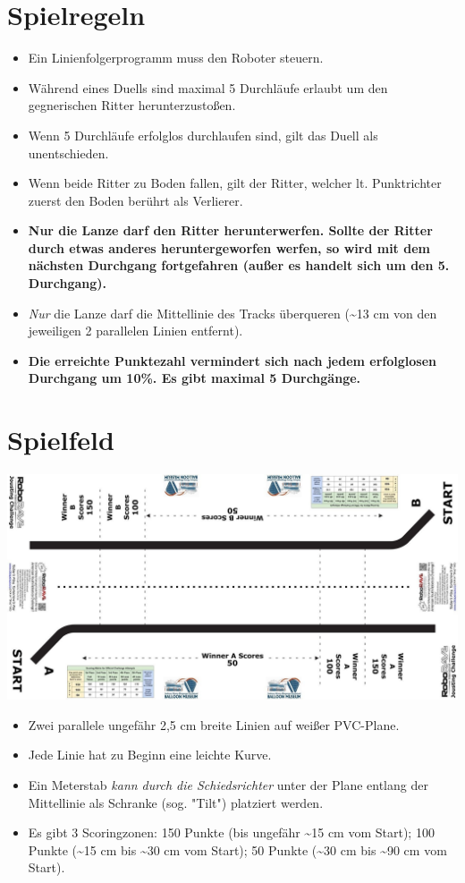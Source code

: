 \documentclass[a4paper,12pt]{article}
\begin{document}
\section{Spielregeln}
\begin{itemize}
	\item Ein Linienfolgerprogramm muss den Roboter steuern.
	
	\item Während eines Duells sind maximal 5 Durchläufe erlaubt um den gegnerischen Ritter herunterzustoßen.
	\item Wenn 5 Durchläufe erfolglos durchlaufen sind, gilt das Duell als unentschieden.
	\item Wenn beide Ritter zu Boden fallen, gilt der Ritter, welcher lt. Punktrichter zuerst den Boden berührt als
	Verlierer.
	\item \textbf{Nur die Lanze darf den Ritter herunterwerfen. Sollte der Ritter durch etwas anderes heruntergeworfen werfen,
	so wird mit dem nächsten Durchgang fortgefahren (außer es handelt sich um den 5. Durchgang).}
	\item \emph{Nur} die Lanze darf die Mittellinie des Tracks überqueren (\textasciitilde13 cm von den jeweiligen 2 parallelen Linien entfernt).
	\item \textbf{Die erreichte Punktezahl vermindert sich nach jedem erfolglosen Durchgang um 10\%. Es gibt maximal 5 Durchgänge.}
\end{itemize}
\section{Spielfeld}
\includegraphics[width=1\textwidth]{track.png}
\begin{itemize}
	\item Zwei parallele ungefähr 2,5 cm breite Linien auf weißer PVC-Plane.
	\item Jede Linie hat zu Beginn eine leichte Kurve.
	\item Ein Meterstab \emph{kann durch die Schiedsrichter} unter der Plane entlang der Mittellinie als Schranke (sog. "Tilt") platziert werden.
	\item Es gibt 3 Scoringzonen: 150 Punkte (bis ungefähr \textasciitilde15 cm vom Start); 100 Punkte (\textasciitilde15 cm bis \textasciitilde30 cm vom
	Start); 50 Punkte (\textasciitilde30 cm bis \textasciitilde90 cm vom Start).
\end{itemize}
\end{document}
